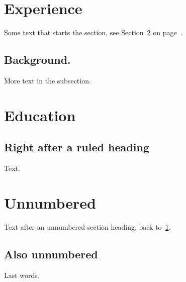 \documentclass[11pt]{article}
\begin{document}
\section{Experience}\label{sec:exp}
Some text that starts the section, see Section~\ref{sec:edu} on page~\pageref{sec:edu}.

\subsection{Background.}\label{sec:bg}
More text in the subsection.
\section{Education}\label{sec:edu}
\subsection{Right after a ruled heading}
Text.
\section*{Unnumbered}
Text after an unnumbered section heading, back to~\ref{sec:exp}.
\subsection*{Also unnumbered}
Last words.
\end{document}
